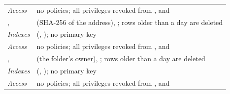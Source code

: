 \begin{longtable}{@{}L{44mm}L{\dimexpr\linewidth-44mm-2\tabcolsep\relax}@{}}
  \emph{Access} & no policies; all privileges revoked from ,  and  \\[3pt]
  ,  &  (SHA-256 of the address), ; rows older than a day are deleted \\
  \emph{Indexes} &  (, ); no primary key \\
  \emph{Access} & no policies; all privileges revoked from ,  and  \\[3pt]
  ,  &  (the folder's owner), ; rows older than a day are deleted \\
  \emph{Indexes} &  (, ); no primary key \\
  \emph{Access} & no policies; all privileges revoked from ,  and  \\
\end{longtable}
\endgroup
